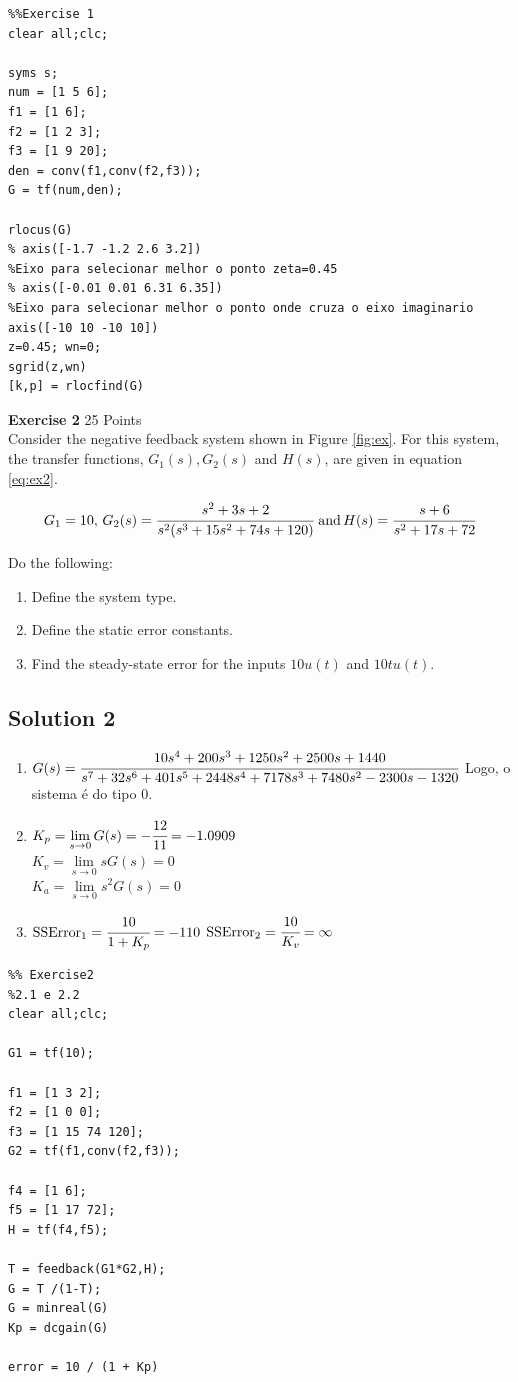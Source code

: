 \documentclass[a4paper,11pt]{article}
\begin{document}
\begin{lstlisting}
%%Exercise 1
clear all;clc;

syms s;
num = [1 5 6];
f1 = [1 6];
f2 = [1 2 3];
f3 = [1 9 20];
den = conv(f1,conv(f2,f3));
G = tf(num,den);

rlocus(G)
% axis([-1.7 -1.2 2.6 3.2])    
%Eixo para selecionar melhor o ponto zeta=0.45
% axis([-0.01 0.01 6.31 6.35]) 
%Eixo para selecionar melhor o ponto onde cruza o eixo imaginario
axis([-10 10 -10 10])
z=0.45; wn=0;
sgrid(z,wn)
[k,p] = rlocfind(G)
\end{lstlisting}
{\Large \noindent \bf Exercise 2} \hfill					25 Points\\

\noindent Consider the negative feedback system shown in Figure \ref{fig:ex}. For this system, the transfer functions, $G_1(s), G_2(s)$ and $H(s)$, are given in equation \ref{eq:ex2}.
  
\begin{equation}
G_1=10, \, G_2(s)=\cfrac{s^2+3s+2}{s^2(s^3+15s^2+74s+120)} \ \text{and} \, H(s)=\cfrac{s+6}{s^2+17s+72}
\label{eq:ex2}
\end{equation} 
  
 \noindent Do the following:
\begin{enumerate}
\item Define the system type.
\item Define the static error constants. 
\item Find the steady-state error for the inputs $10u(t)$ and $10tu(t)$.  
\end{enumerate}
\subsection*{Solution 2}
\begin{enumerate}
	\item $G(s)=\cfrac{10 s^4 + 200 s^3 + 1250 s^2 + 2500 s + 1440}{s^7 + 32 s^6 + 401 s^5 + 2448 s^4 + 7178 s^3 + 7480 s^2 - 2300 s - 1320} $
	\vskip0.4cm
	Logo, o sistema é do tipo 0.
	\item $K_p =\lim\limits_{s\to0}G(s) = -\cfrac{12}{11} = -1.0909$\\
	$ K_v = \lim\limits_{s\to0}sG(s) = 0 $\\
	$ K_a = \lim\limits_{s\to0}s^2G(s) = 0 $\\
	\item $\text{SSError}_1 = \cfrac{10}{1 + K_p} = -110 $
	\vskip0.4cm
	$\text{SSError}_2 = \cfrac{10}{K_v} = \infty$
\end{enumerate}
\begin{lstlisting}
%% Exercise2
%2.1 e 2.2
clear all;clc;

G1 = tf(10);

f1 = [1 3 2];
f2 = [1 0 0];
f3 = [1 15 74 120];
G2 = tf(f1,conv(f2,f3));

f4 = [1 6];
f5 = [1 17 72];
H = tf(f4,f5);

T = feedback(G1*G2,H);
G = T /(1-T);
G = minreal(G)
Kp = dcgain(G)

error = 10 / (1 + Kp)
\end{lstlisting}
\vskip0.3cm
\end{document}
